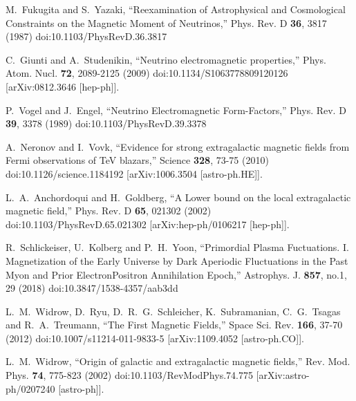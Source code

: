 \documentclass[universe,article,submit,moreauthors,pdftex,a4paper]{Definitions/mdpi}
\begin{document}
\begin{thebibliography}{99}
M.~Fukugita and S.~Yazaki,
``Reexamination of Astrophysical and Cosmological Constraints on the Magnetic Moment of Neutrinos,''
Phys. Rev. D \textbf{36}, 3817 (1987)
doi:10.1103/PhysRevD.36.3817

C.~Giunti and A.~Studenikin,
``Neutrino electromagnetic properties,''
Phys. Atom. Nucl. \textbf{72}, 2089-2125 (2009)
doi:10.1134/S1063778809120126
[arXiv:0812.3646 [hep-ph]].


P.~Vogel and J.~Engel,
``Neutrino Electromagnetic Form-Factors,''
Phys. Rev. D \textbf{39}, 3378 (1989)
doi:10.1103/PhysRevD.39.3378

A.~Neronov and I.~Vovk,
``Evidence for strong extragalactic magnetic fields from Fermi observations of TeV blazars,''
Science \textbf{328}, 73-75 (2010)
doi:10.1126/science.1184192
[arXiv:1006.3504 [astro-ph.HE]].

L.~A.~Anchordoqui and H.~Goldberg,
``A Lower bound on the local extragalactic magnetic field,''
Phys. Rev. D \textbf{65}, 021302 (2002)
doi:10.1103/PhysRevD.65.021302
[arXiv:hep-ph/0106217 [hep-ph]].

R.~Schlickeiser, U.~Kolberg and P.~H.~Yoon,
``Primordial Plasma Fuctuations. I. Magnetization of the Early Universe by Dark Aperiodic Fluctuations in the Past Myon and Prior Electron\textendash{}Positron Annihilation Epoch,''
Astrophys. J. \textbf{857}, no.1, 29 (2018)
doi:10.3847/1538-4357/aab3dd

L.~M.~Widrow, D.~Ryu, D.~R.~G.~Schleicher, K.~Subramanian, C.~G.~Tsagas and R.~A.~Treumann,
``The First Magnetic Fields,''
Space Sci. Rev. \textbf{166}, 37-70 (2012)
doi:10.1007/s11214-011-9833-5
[arXiv:1109.4052 [astro-ph.CO]].

L.~M.~Widrow,
``Origin of galactic and extragalactic magnetic fields,''
Rev. Mod. Phys. \textbf{74}, 775-823 (2002)
doi:10.1103/RevModPhys.74.775
[arXiv:astro-ph/0207240 [astro-ph]].


\end{thebibliography}
\end{document}
